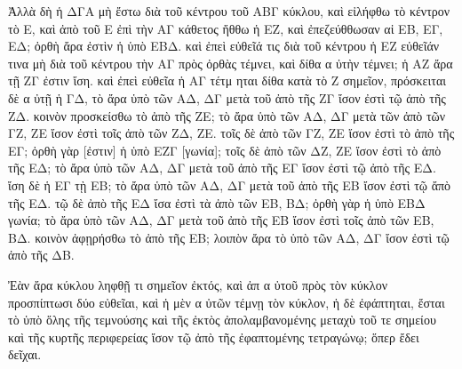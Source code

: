 \begin{Parallel}{}{}
{{\greekfont Ἀλλὰ δὴ ἡ ΔΓΑ μὴ ἔστω διὰ τοῦ κέντρου τοῦ ΑΒΓ κύκλου,
καὶ εἰλήφθω τὸ κέντρον τὸ Ε, καὶ 
ἀπὸ τοῦ Ε ἐπὶ τὴν ΑΓ κάθετος ἤθθω ἡ ΕΖ, καὶ ἐπεζεύθθωσαν
αἱ ΕΒ, ΕΓ, ΕΔ; ὀρθὴ ἄρα ἐστὶν ἡ ὑπὸ ΕΒΔ. καὶ ἐπεὶ εὐθεῖά
τις διὰ τοῦ κέντρου ἡ ΕΖ εὐθεῖάν τινα μὴ διὰ τοῦ κέντρου τὴν
ΑΓ πρὸς ὀρθὰς τέμνει, καὶ δίθα α ὐτὴν τέμνει; ἡ ΑΖ ἄρα τῇ
ΖΓ ἐστιν ἴση. καὶ ἐπεὶ εὐθεῖα ἡ ΑΓ τέτμ ηται δίθα κατὰ τὸ Ζ
σημεῖον, πρόσκειται δὲ α ὐτῇ ἡ ΓΔ, τὸ ἄρα ὑπὸ τῶν ΑΔ, ΔΓ μετὰ
τοῦ ἀπὸ τῆς ΖΓ ἴσον ἐστὶ τῷ ἀπὸ τῆς ΖΔ. κοινὸν προσκείσθω τὸ
ἀπὸ τῆς ΖΕ; τὸ ἄρα ὑπὸ τῶν ΑΔ, ΔΓ μετὰ τῶν ἀπὸ
τῶν ΓΖ, ΖΕ ἴσον ἐστὶ τοῖς ἀπὸ τῶν ΖΔ, ΖΕ. τοῖς δὲ ἀπὸ
τῶν ΓΖ, ΖΕ ἴσον ἐστὶ τὸ ἀπὸ τῆς ΕΓ; ὀρθὴ γὰρ [ἐστιν]
 ἡ ὑπὸ ΕΖΓ [γωνία]; τοῖς δὲ ἀπὸ τῶν ΔΖ, ΖΕ ἴσον ἐστὶ
 τὸ ἀπὸ τῆς ΕΔ; τὸ ἄρα ὑπὸ τῶν ΑΔ, ΔΓ μετὰ τοῦ ἀπὸ
 τῆς ΕΓ ἴσον ἐστὶ τῷ ἀπὸ τῆς ΕΔ. ἴση
 δὲ ἡ ΕΓ τῂ ΕΒ; 
 τὸ ἄρα ὑπὸ τῶν ΑΔ, ΔΓ μετὰ τοῦ ἀπὸ τῆς ΕΒ ἴσον
 ἐστὶ τῷ ἄπὸ τῆς ΕΔ.
  τῷ δὲ ἀπὸ τῆς ΕΔ
 ἴσα ἐστὶ τὰ ἀπὸ τῶν ΕΒ, ΒΔ; ὀρθὴ γὰρ ἡ ὑπὸ ΕΒΔ γωνία;
 τὸ ἄρα ὑπὸ τῶν ΑΔ, ΔΓ μετὰ τοῦ ἀπὸ 
τῆς ΕΒ ἴσον 
 ἐστὶ τοῖς ἀπὸ τῶν ΕΒ, ΒΔ. κοινὸν ἀφῃρήσθω τὸ ἀπὸ τῆς
 ΕΒ; λοιπὸν ἄρα τὸ ὑπὸ τῶν ΑΔ, ΔΓ ἴσον ἐστὶ τῷ ἀπὸ τῆς
 ΔΒ.}
 
 {\greekfont Ἐὰν ἄρα κύκλου ληφθῇ τι σημεῖον ἐκτός, καὶ ἀπ α ὐτοῦ πρὸς τὸν
κύκλον προσπίπτωσι δύο εὐθεῖαι, καὶ ἡ μὲν α ὐτῶν τέμνῃ τὸν
κύκλον, ἡ δὲ ἐφάπτηται, ἔσται τὸ ὑπὸ ὅλης τῆς τεμνούσης
καὶ τῆς ἐκτὸς ἀπολαμβανομένης μεταχὺ τοῦ τε σημείου καὶ
τῆς κυρτῆς περιφερείας ἴσον τῷ ἀπὸ τῆς ἐφαπτομένης τετραγώνῳ;
ὅπερ ἔδει δεῖχαι.}}

\end{Parallel}
